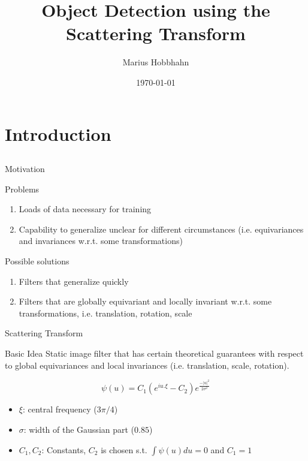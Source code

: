 \documentclass[compress]{beamer}
\title[BA Hobbhahn 2019]{Object Detection using the Scattering Transform}
\author{Marius Hobbhahn}
\date{\today}
\begin{document}
	
	\begin{frame}
		\titlepage
	\end{frame}
	\section{Introduction}
	\subsection{ } %
	\begin{frame}{Motivation}
		\begin{block}{Problems}
			\begin{enumerate}
				\item Loads of data necessary for training
				\item Capability to generalize unclear for different circumstances (i.e. equivariances and invariances w.r.t. some transformations)
			\end{enumerate}
		\end{block}
		\begin{block}{Possible solutions}
			\begin{enumerate}
				\item Filters that generalize quickly
				\item Filters that are globally equivariant and locally invariant w.r.t. some transformations, i.e. translation, rotation, scale 
			\end{enumerate}
		\end{block}
	\end{frame}
	\begin{frame}{Scattering Transform}
		\begin{block}{Basic Idea}
			Static image filter that has certain theoretical guarantees with respect to global equivariances and local invariances (i.e. translation, scale, rotation).
		\end{block}
		\begin{equation}
		\psi(u) = C_1 (e^{iu.\xi} - C_2) e^{\frac{-|u|^2}{2\sigma^2}}
		\label{eq:morlet2d}
		\end{equation}
		\begin{itemize}
			\item $\xi$: central frequency ($3\pi/4$)
			\item $\sigma$: width of the Gaussian part ($0.85$)
			\item $C_1, C_2$: Constants, $C_2$ is chosen s.t. $\int \psi(u)du = 0$ and $C_1 = 1$
		\end{itemize}
	\end{frame}
\end{document}
